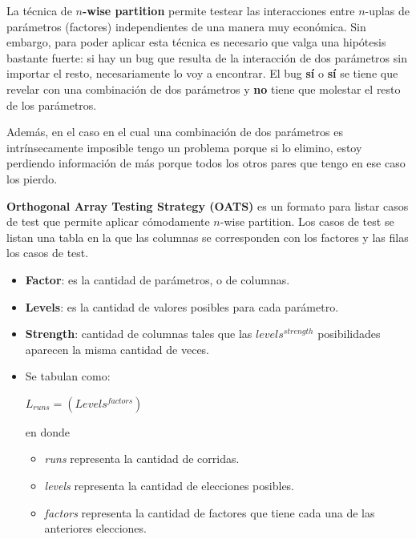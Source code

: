 \documentclass[]{article}
\begin{document}

La técnica de \textbf{$n$-wise partition} permite testear las interacciones entre $n$-uplas de parámetros (factores) independientes de una manera muy económica. Sin embargo, para poder aplicar esta técnica es necesario que valga una hipótesis bastante fuerte: si hay un bug que resulta de la interacción de dos parámetros sin importar el resto, necesariamente lo voy a encontrar. El bug \textbf{sí} o \textbf{sí} se tiene que revelar con una combinación de dos parámetros y \textbf{no} tiene que molestar el resto de los parámetros.

Además, en el caso en el cual una combinación de dos parámetros es intrínsecamente imposible tengo un problema porque si lo elimino, estoy perdiendo información de más porque todos los otros pares que tengo en ese caso los pierdo.

\textbf{Orthogonal Array Testing Strategy (OATS)} es un formato para listar casos de test que permite aplicar cómodamente $n$-wise partition. Los casos de test se listan una tabla en la que las columnas se corresponden con los factores y las filas los casos de test.

\begin{itemize}
	\item \textbf{Factor}: es la cantidad de parámetros, o de columnas.
	\item \textbf{Levels}: es la cantidad de valores posibles para cada parámetro.
	\item \textbf{Strength}: cantidad de columnas tales que las $levels^{strength}$ posibilidades aparecen la misma cantidad de veces.
	\item Se tabulan como:
	\begin{center}
		$L_{runs} = (Levels^{factors})$
	\end{center}
	en donde
	\begin{itemize}
		\item \textit{runs} representa la cantidad de corridas.
		\item \textit{levels} representa la cantidad de elecciones posibles.
		\item \textit{factors} representa la cantidad de factores que tiene cada una de las anteriores elecciones.
	\end{itemize}
\end{itemize}

~\newline
\end{document}
